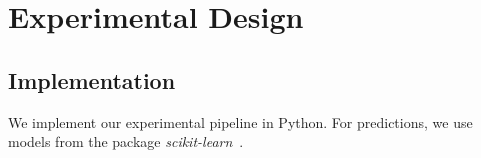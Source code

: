 \section{Experimental Design}
\label{sec:experimental-design}

\subsection{Implementation}

We implement our experimental pipeline in Python.
For predictions, we use models from the package \emph{scikit-learn}~\cite{scikit-learn}.

